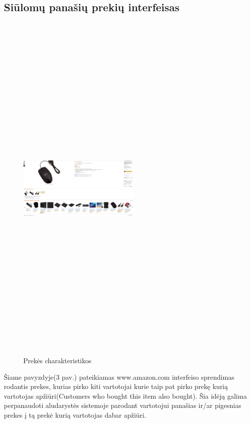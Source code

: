 \documentclass[oneside]{VUMIFPSkursinis}
\begin{document}
	\subsection{Siūlomų panašių prekių interfeisas }
		\begin{figure}[h]
			\centering
			\includegraphics[width=6cm,height=18cm,keepaspectratio]{IkvepiantisInterfeisas3.png}
			\caption{ Prekės charakteristikos}
		\end{figure}

			Šiame pavyzdyje(3 pav.) pateikiamas www.amazon.com interfeiso sprendimas rodantis prekes, kurias pirko kiti vartotojai kurie taip pat pirko prekę kurią vartotojas apžiūri(Customers who bought this item also bought). 
			Šia idėją galima perpanaudoti aludarystės sistemoje parodant vartotojui panašias ir/ar pigesnias prekes į tą prekė kurią vartotojas dabar apžiūri.

	\pagebreak
\end{document}
